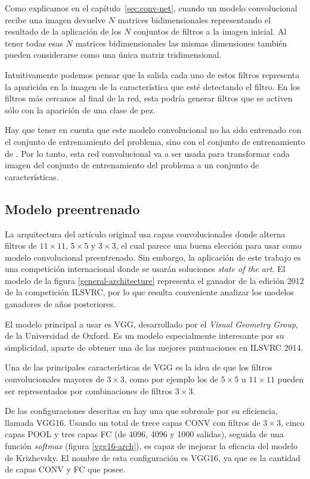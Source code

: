 Como explicamos en el capítulo~\ref{sec:conv-net}, cuando un modelo convolucional recibe una imagen devuelve $N$ matrices bidimensionales representando el resultado de la aplicación de los $N$ conjuntos de filtros a la imagen inicial. Al tener todas esas $N$ matrices bidimensionales las mismas dimensiones también pueden considerarse como una única matriz tridimensional.

Intuitivamente podemos pensar que la salida cada uno de estos filtros representa la aparición en la imagen de la característica que esté detectando el filtro. En los filtros más cercanos al final de la red, esta podría generar filtros que se activen sólo con la aparición de una clase de pez.

Hay que tener en cuenta que este modelo convolucional no ha sido entrenado con el conjunto de entrenamiento del problema, sino con el conjunto de entrenamiento de \parencite{imagenet}. Por lo tanto, esta red convolucional va a ser usada para transformar cada imagen del conjunto de entrenamiento del problema a un conjunto de características.

\subsection{Modelo preentrenado}

La arquitectura del artículo original \parencite{krizhevsky2012imagenet} usa capas convolucionales donde alterna filtros de $11\times11$, $5\times5$ y $3\times3$, el cual parece una buena elección para usar como modelo convolucional preentrenado. Sin embargo, la aplicación de este trabajo es una competición internacional donde se usarán soluciones \textit{state of the art}. El modelo de la figura \ref{general-architecture} representa el ganador de la edición 2012 de la competición ILSVRC, por lo que resulta conveniente analizar los modelos ganadores de años posteriores.

El modelo principal a usar es VGG, desarrollado por el \textit{Visual Geometry Group}, de la Universidad de Oxford. Es un modelo especialmente interesante por su simplicidad, aparte de obtener una de las mejores puntuaciones en ILSVRC 2014.


Una de las principales características de VGG es la idea de que los filtros convolucionales mayores de $3\times3$, como por ejemplo los de $5\times5$ u $11\times11$ pueden ser representados por combinaciones de filtros $3\times3$.

De las configuraciones descritas en \parencite{simonyan} hay una que sobresale por su eficiencia, llamada VGG16. Usando un total de trece capas CONV con filtros de $3\times3$, cinco capas POOL y tres capas FC (de 4096, 4096 y 1000 salidas), seguida de una función \textit{softmax} (figura \ref{vgg16-arch}), es capaz de mejorar la eficacia del modelo de Krizhevsky. El nombre de esta configuración es VGG16, ya que es la cantidad de capas CONV y FC que posee.

